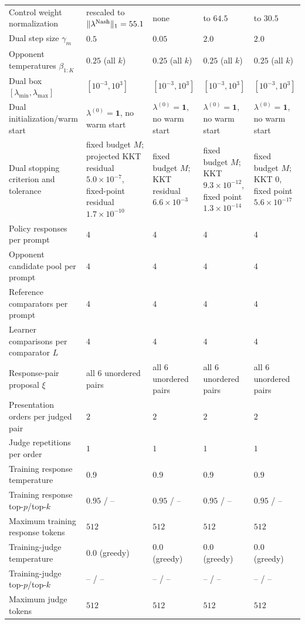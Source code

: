\documentclass{article}
\theoremstyle{remark}
\theoremstyle{plain}
\begin{document}
\begin{table}[t]
\begin{tabular}{@{}p{}p{}p{}p{}p{}@{}}
Control weight normalization & rescaled to $\|\lambda^{\rm Nash}\|_1=55.1$ & none & to $64.5$ & to $30.5$ \\
Dual step size $\gamma_m$ & $0.5$ & $0.05$ & $2.0$ & $2.0$ \\
Opponent temperatures $\beta_{1:K}$ & $0.25$ (all $k$) & $0.25$ (all $k$) & $0.25$ (all $k$) & $0.25$ (all $k$) \\
Dual box $[\lambda_{\min},\lambda_{\max}]$ & $[10^{-3},10^{3}]$ & $[10^{-3},10^{3}]$ & $[10^{-3},10^{3}]$ & $[10^{-3},10^{3}]$ \\
Dual initialization/warm start & $\lambda^{(0)}=\mathbf 1$, no warm start & $\lambda^{(0)}=\mathbf 1$, no warm start & $\lambda^{(0)}=\mathbf 1$, no warm start & $\lambda^{(0)}=\mathbf 1$, no warm start \\
Dual stopping criterion and tolerance & fixed budget $M$; projected KKT residual $5.0\times10^{-7}$, fixed-point residual $1.7\times10^{-10}$ & fixed budget $M$; KKT residual $6.6\times10^{-3}$ & fixed budget $M$; KKT $9.3\times10^{-12}$, fixed point $1.3\times10^{-14}$ & fixed budget $M$; KKT $0$, fixed point $5.6\times10^{-17}$ \\
Policy responses per prompt & $4$ & $4$ & $4$ & $4$ \\
Opponent candidate pool per prompt & $4$ & $4$ & $4$ & $4$ \\
Reference comparators per prompt & $4$ & $4$ & $4$ & $4$ \\
Learner comparisons per comparator $L$ & $4$ & $4$ & $4$ & $4$ \\
Response-pair proposal $\xi$ & all $6$ unordered pairs & all $6$ unordered pairs & all $6$ unordered pairs & all $6$ unordered pairs \\
Presentation orders per judged pair & $2$ & $2$ & $2$ & $2$ \\
Judge repetitions per order & $1$ & $1$ & $1$ & $1$ \\
Training response temperature & $0.9$ & $0.9$ & $0.9$ & $0.9$ \\
Training response top-$p$/top-$k$ & $0.95$ / -- & $0.95$ / -- & $0.95$ / -- & $0.95$ / -- \\
Maximum training response tokens & $512$ & $512$ & $512$ & $512$ \\
Training-judge temperature & $0.0$ (greedy) & $0.0$ (greedy) & $0.0$ (greedy) & $0.0$ (greedy) \\
Training-judge top-$p$/top-$k$ & -- / -- & -- / -- & -- / -- & -- / -- \\
Maximum judge tokens & $512$ & $512$ & $512$ & $512$ \\

\end{tabular}
\end{table}
\end{document}
